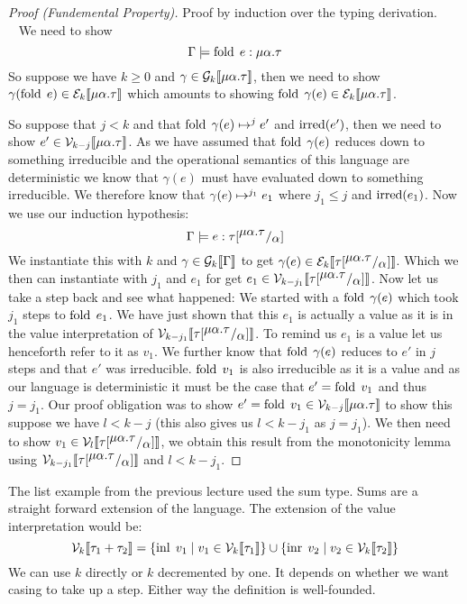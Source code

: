 \begin{proof}[Proof (Fundemental Property)]
Proof by induction over the typing derivation.
\case{\TFold} \\~
We need to show 
\newcommand{\mat}{\ensuremath{\mu\alpha.\tau}}
\[
  \Gamma \models \fold \; e : \mat
\]
So suppose we have $k \geq 0$ and $\gamma \in \gpres{\mat}$, then we need to show $\gamma(\fold\; e) \in \epres{\mat}$ which amounts to showing $\fold\; \gamma(e) \in \epres{\mat}$.

So suppose that $j<k$ and that $\fold\; \gamma(e) \evaltos[j] e'$ and $\irred(e')$, then we need to show $e' \in \vpres[k-j]{\mat}$. As we have assumed that $\fold\; \gamma(e)$ reduces down to something irreducible and the operational semantics of this language are deterministic we know that $\gamma(e)$ must have evaluated down to something irreducible. We therefore know that $\gamma(e) \evaltos[j_1] e_1$ where $j_1 \leq j$ and $\irred(e_1)$.
Now we use our induction hypothesis:
\newcommand{\tsub}{\ensuremath{\sub{\tau}{\mat}{\alpha}}}
\[
  \Gamma \models e : \tsub
\]
We instantiate this with $k$ and $\gamma \in \gpres{\Gamma}$ to get $\gamma(e) \in \epres{\tsub}$. Which we then can instantiate with $j_1$ and $e_1$ for get $e_1 \in \vpres[k-j_1]{\tsub}$. Now let us take a step back and see what happened: We started with a $\fold\; \gamma(e)$ which took $j_1$ steps to $\fold\; e_1$. We have just shown that this $e_1$ is actually a value as it is in the value interpretation of $\vpres[k-j_1]{\tsub}$. To remind us $e_1$ is a value let us henceforth refer to it as $v_1$. We further know that $\fold\; \gamma(e)$ reduces to $e'$ in $j$ steps and that $e'$ was irreducible. $\fold\; v_1$ is also irreducible as it is a value and as our language is deterministic it must be the case that $e' = \fold\; v_1$ and thus $j = j_1$. Our proof obligation was to show $e' = \fold \; v_1 \in \vpres[k-j]{\mat}$ to show this suppose we have $l < k-j$ (this also gives us $l < k-j_1$ as $j = j_1$). We then need to show $v_1 \in \vpres[l]{\tsub}$, we obtain this result from the monotonicity lemma using $\vpres[k-j_1]{\tsub}$ and $l < k-j_1$.
\end{proof}

The list example from the previous lecture used the sum type. Sums are a straight forward extension of the language. The extension of the value interpretation would be:
\[
  \vpres{\tau_1 + \tau_2} = \{\inl \; v_1 \vbar v_1 \in \vpres{\tau_1}\} \cup 
                            \{\inr \; v_2 \vbar v_2 \in \vpres{\tau_2}\}
\]
We can use $k$ directly or $k$ decremented by one. It depends on whether we want casing to take up a step. Either way the definition is well-founded. 


